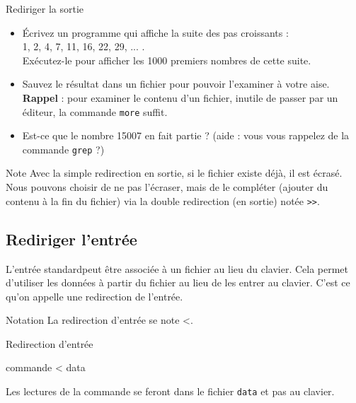 \documentclass[a4paper,11pt]{article}
\begin{document}
            \newpage
\begin{Exercice}{Rediriger la sortie}
	\begin{itemize}
			\item Écrivez un programme qui affiche la suite des pas croissants :\\
				 1, 2, 4, 7, 11, 16, 22, 29, ... .\\
				  Ex\'ecutez-le pour afficher les 1000 premiers nombres de cette suite.
					
			\item Sauvez le r\'esultat dans un fichier pour pouvoir l'examiner \`a votre aise.\\
				\textbf{Rappel} : pour examiner le contenu d'un fichier, inutile de passer par un \'editeur,
				la commande \verb_more_ suffit.
					
			\item Est-ce que le nombre 15007 en fait partie ? (aide : vous vous rappelez de la commande \verb_grep_ ?)
					
	\end{itemize}
				

\end{Exercice}

\begin{coltbox}{Note} 
	Avec la simple redirection en sortie, si le fichier existe d\'ej\`a, il est \'ecras\'e. 
	Nous pouvons choisir de ne pas l'\'ecraser, mais de le compl\'eter 
	(ajouter du contenu \`a la fin du fichier) via la double redirection (en sortie) not\'ee 
					\verb_>>_.			
	
\end{coltbox}
	\subsection{Rediriger l'entrée}

		L'\guillemotleft entr\'ee standard\guillemotright  peut \^etre associ\'ee \`a un fichier au lieu du clavier.
		Cela permet d'utiliser les donn\'ees \`a partir du fichier au lieu de les entrer au clavier.
		C'est ce qu'on appelle une redirection de l'entr\'ee.
			
		\begin{coltbox}{Notation}
			La redirection d'entr\'ee se note \guillemotleft <\guillemotright .
		\end{coltbox}
        \par
		\begin{Exemple}{Redirection d'entrée}
		        \begin{Console}
		        		commande < data
			\end{Console}
		\end{Exemple}
		Les lectures de la commande se feront dans le fichier \verb_data_
		et pas au clavier.
		
\end{document}
